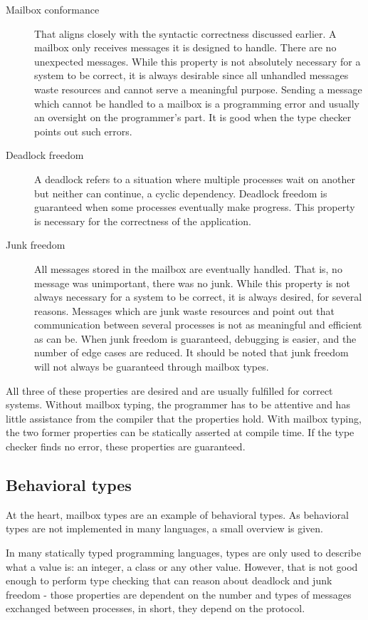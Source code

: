 \begin{description}
    \item[Mailbox conformance] That aligns closely with the syntactic correctness discussed earlier.
    A mailbox only receives messages it is designed to handle.
    There are no unexpected messages.
    While this property is not absolutely necessary for a system to be correct, it is always desirable since all unhandled messages waste resources and cannot serve a meaningful purpose.
    Sending a message which cannot be handled to a mailbox is a programming error and usually an oversight on the programmer's part.
    It is good when the type checker points out such errors.
    \item[Deadlock freedom] A deadlock refers to a situation where multiple processes wait on another but neither can continue, a cyclic dependency.
    Deadlock freedom is guaranteed when some processes eventually make progress.
    This property is necessary for the correctness of the application.
    \item[Junk freedom] All messages stored in the mailbox are eventually handled.
    That is, no message was unimportant, there was no junk.
    While this property is not always necessary for a system to be correct, it is always desired, for several reasons.
    Messages which are junk waste resources and point out that communication between several processes is not as meaningful and efficient as can be.
    When junk freedom is guaranteed, debugging is easier, and the number of edge cases are reduced. It should be noted that junk freedom will not always be guaranteed through mailbox types.
\end{description}


All three of these properties are desired and are usually fulfilled for correct systems.
Without mailbox typing, the programmer has to be attentive and has little assistance from the compiler that the properties hold.
With mailbox typing, the two former properties can be statically asserted at compile time.
If the type checker finds no error, these properties are guaranteed.


\subsection{Behavioral types}
At the heart, mailbox types are an example of behavioral types.
As behavioral types are not implemented in many languages, a small overview is given.

In many statically typed programming languages, types are only used to describe what a value is: an integer, a class or any other value.
However, that is not good enough to perform type checking that can reason about deadlock and junk freedom - those properties are dependent on the number and types of messages exchanged between processes, in short, they depend on the protocol.

